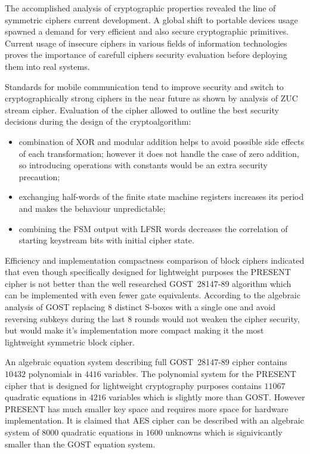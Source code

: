 % 

\label{sec:conclusions}

The accomplished analysis of cryptographic properties revealed the line of
symmetric ciphers current development. A global shift to portable devices usage
spawned a demand for very efficient and also secure cryptographic primitives.
Current usage of insecure ciphers in various fields of information technologies
proves the importance of carefull ciphers security evaluation before
deploying them into real systems. 

Standards for mobile communication tend to improve security and switch to
cryptographically strong ciphers in the near future as shown by 
analysis of ZUC stream cipher. Evaluation of the cipher allowed to outline the
best security decisions during the design of the cryptoalgorithm:
\begin{itemize}
    \item combination of XOR and modular addition helps to avoid possible side
        effects of each transformation; however it does not handle the case of
        zero addition, so introducing operations with constants would be an
        extra security precaution;
    \item exchanging half-words of the finite state machine registers increases
        its period and makes the behaviour unpredictable;
    \item combining the FSM output with LFSR words decreases the correlation of
        starting keystream bits with initial cipher state.
\end{itemize}

Efficiency and implementation compactness comparison of block ciphers indicated
that even though specifically designed for lightweight
purposes the PRESENT cipher is not better than the well researched GOST~28147-89
algorithm which can be implemented with even fewer gate equivalents. According
to the algebraic analysis of GOST replacing 8 distinct S-boxes with a single
one and avoid reversing subkeys during the last 8 rounds would not weaken the
cipher security, but would make it's implementation more compact making it the
most lightweight symmetric block cipher.

An algebraic equation system describing full GOST~28147-89 cipher contains
$10432$ polynomials in $4416$ variables. The polynomial system for the PRESENT
cipher that is designed for lightweight cryptography purposes contains $11067$
quadratic equations in $4216$ variables which is
slightly more than GOST. However PRESENT has much smaller key space and
requires more space for hardware implementation. It is claimed that AES cipher can be described with an algebraic system of
$8000$ quadratic equations in $1600$ unknowns which is signivicantly smaller
than the GOST equation system. 

